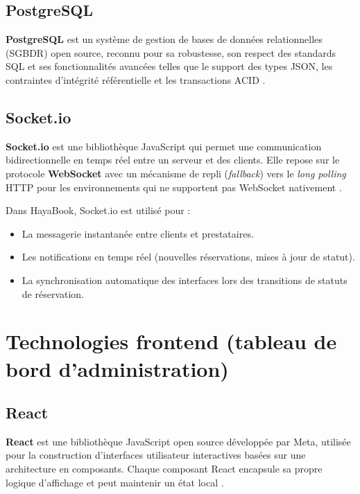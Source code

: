 \subsection{PostgreSQL}

\textbf{PostgreSQL} est un système de gestion de bases de données relationnelles (SGBDR) open source, reconnu pour sa robustesse, son respect des standards SQL et ses fonctionnalités avancées telles que le support des types JSON, les contraintes d'intégrité référentielle et les transactions ACID \cite{postgresql_docs}.

\subsection{Socket.io}

\textbf{Socket.io} est une bibliothèque JavaScript qui permet une communication bidirectionnelle en temps réel entre un serveur et des clients. Elle repose sur le protocole \textbf{WebSocket} avec un mécanisme de repli (\textit{fallback}) vers le \textit{long polling} HTTP pour les environnements qui ne supportent pas WebSocket nativement \cite{socketio_docs}.

Dans HayaBook, Socket.io est utilisé pour :
\begin{itemize}
    \item La messagerie instantanée entre clients et prestataires.
    \item Les notifications en temps réel (nouvelles réservations, mises à jour de statut).
    \item La synchronisation automatique des interfaces lors des transitions de statuts de réservation.
\end{itemize}

\section{Technologies frontend (tableau de bord d'administration)}

\subsection{React}

\textbf{React} est une bibliothèque JavaScript open source développée par Meta, utilisée pour la construction d'interfaces utilisateur interactives basées sur une architecture en composants. Chaque composant React encapsule sa propre logique d'affichage et peut maintenir un état local \cite{react_docs}.

